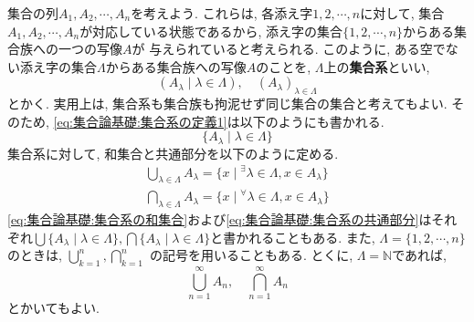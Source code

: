 \documentclass[a4j,dvipdfmx]{jsarticle}
\numberwithin{equation}{section}
\begin{document}
            集合の列$A_1,A_2,\cdots,A_n$を考えよう. これらは, 各添え字$1,2,\cdots,n$に対して, 集合$A_1,A_2,\cdots,A_n$が対応している状態であるから, 添え字の集合$\{1,2,\cdots,n\}$からある集合族への一つの写像$A$が
            与えられていると考えられる. このように, ある空でない添え字の集合$\Lambda$からある集合族への写像$A$のことを, $\Lambda$上の\textbf{集合系}といい, 
            \begin{equation}
                (A_\lambda\mid\lambda \in \Lambda),\quad (A_\lambda)_{\lambda\in\Lambda} \label{eq:集合論基礎:集合系の定義1}
            \end{equation}
            とかく. 実用上は, 集合系も集合族も拘泥せず同じ集合の集合と考えてもよい. そのため, \eqref{eq:集合論基礎:集合系の定義1}は以下のようにも書かれる.
            \begin{equation}
                \{A_\lambda\mid \lambda\in\Lambda\} \label{eq:集合論基礎:集合系の定義2}
            \end{equation}
            集合系に対して, 和集合と共通部分を以下のように定める.
            \begin{align}
                \bigcup_{\lambda\in \Lambda} A_\lambda = \{x\mid {}^\exists \lambda \in \Lambda,x\in A_\lambda\} \label{eq:集合論基礎:集合系の和集合}\\
                \bigcap_{\lambda\in \Lambda} A_\lambda = \{x\mid {}^\forall \lambda \in \Lambda,x\in A_\lambda\} \label{eq:集合論基礎:集合系の共通部分}
            \end{align}
            \eqref{eq:集合論基礎:集合系の和集合}および\eqref{eq:集合論基礎:集合系の共通部分}はそれぞれ$\bigcup \{A_\lambda\mid\lambda\in\Lambda\},\bigcap \{A_\lambda\mid\lambda\in\Lambda\}$と書かれることもある. また, $\Lambda=\{1,2,\cdots,n\}$のときは, $\displaystyle\bigcup_{k=1}^{n},\bigcap_{k=1}^{n}$
            の記号を用いることもある. とくに, $\Lambda = \mathbb{N}$であれば, 
            \begin{equation*}
                \bigcup_{n=1}^{\infty}A_n,\quad \bigcap_{n=1}^{\infty}A_n
            \end{equation*}
            とかいてもよい. 
\end{document}
